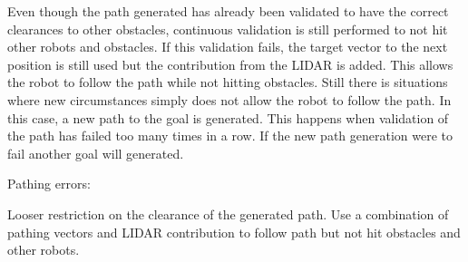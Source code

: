 Even though the path generated has already been validated to have the correct clearances to other obstacles, continuous validation is still performed to not hit other robots and obstacles.
If this validation fails, the target vector to the next position is still used but the contribution from the LIDAR is added. This allows the robot to follow the path while not hitting obstacles. 
Still there is situations where new circumstances simply does not allow the robot to follow the path. In this case, a new path to the goal is generated. This happens when validation of the path has failed too many times in a row. If the new path generation were to fail another goal will generated.

Pathing errors:

Looser restriction on the clearance of the generated path.
Use a combination of pathing vectors and LIDAR contribution to follow path but not hit obstacles and other robots.
